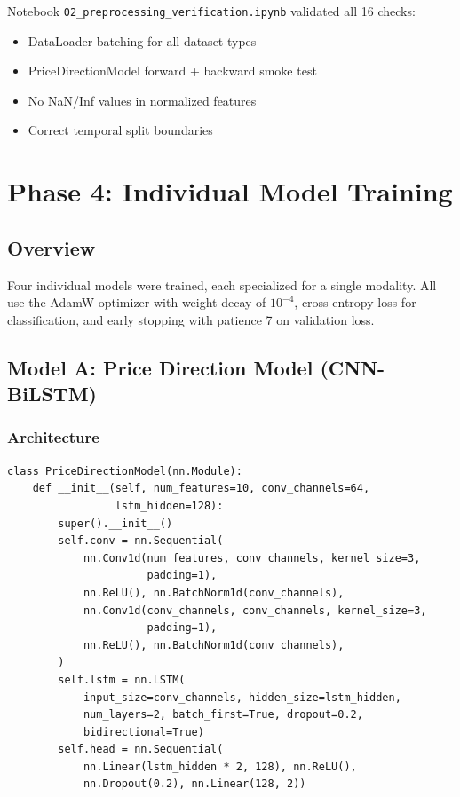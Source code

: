 \documentclass[12pt,a4paper]{article}
\begin{document}
Notebook \texttt{02\_preprocessing\_verification.ipynb} validated all 16 checks:
\begin{itemize}[noitemsep]
    \item DataLoader batching for all dataset types
    \item PriceDirectionModel forward + backward smoke test
    \item No NaN/Inf values in normalized features
    \item Correct temporal split boundaries
\end{itemize}

\section{Phase 4: Individual Model Training}
\label{sec:phase4}

\subsection{Overview}

Four individual models were trained, each specialized for a single modality. All use the AdamW optimizer with weight decay of $10^{-4}$, cross-entropy loss for classification, and early stopping with patience 7 on validation loss.

\subsection{Model A: Price Direction Model (CNN-BiLSTM)}

\subsubsection{Architecture}

\begin{lstlisting}[caption={PriceDirectionModel (\texttt{src/models/price\_model.py})}]
class PriceDirectionModel(nn.Module):
    def __init__(self, num_features=10, conv_channels=64,
                 lstm_hidden=128):
        super().__init__()
        self.conv = nn.Sequential(
            nn.Conv1d(num_features, conv_channels, kernel_size=3,
                      padding=1),
            nn.ReLU(), nn.BatchNorm1d(conv_channels),
            nn.Conv1d(conv_channels, conv_channels, kernel_size=3,
                      padding=1),
            nn.ReLU(), nn.BatchNorm1d(conv_channels),
        )
        self.lstm = nn.LSTM(
            input_size=conv_channels, hidden_size=lstm_hidden,
            num_layers=2, batch_first=True, dropout=0.2,
            bidirectional=True)
        self.head = nn.Sequential(
            nn.Linear(lstm_hidden * 2, 128), nn.ReLU(),
            nn.Dropout(0.2), nn.Linear(128, 2))
\end{lstlisting}
\end{document}
